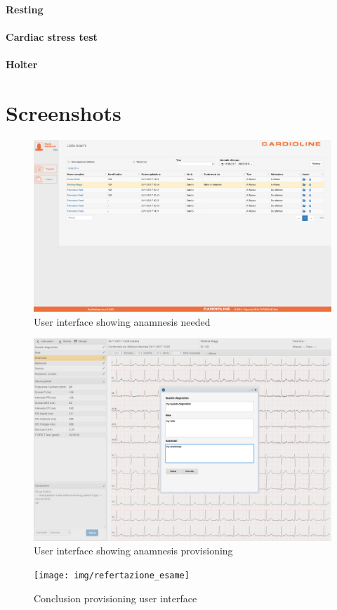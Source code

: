 \paragraph{Resting}
\label{paragraph:Resting}
\paragraph{Cardiac stress test}
\label{paragraph:Cardiac stress test}
\paragraph{Holter}
\label{paragraph:Holter}

\section{Screenshots}
\begin{figure}[h]
    \includegraphics[width=\textwidth]{img/todo_anamnesi}
    \caption{User interface showing anamnesis needed}
    \label{fig:todo_anamnesi}
\end{figure}

\begin{figure}[h]
    \includegraphics[width=\textwidth]{img/aggiunta_anamnesi}
    \caption{User interface showing anamnesis provisioning}
    \label{fig:aggiunta_anamnesi}
\end{figure}

\begin{figure}[h]
    \texttt{[image: img/refertazione\_esame]}
    \caption{Conclusion provisioning user interface}
    \label{fig:refertazione_esame}
\end{figure}



